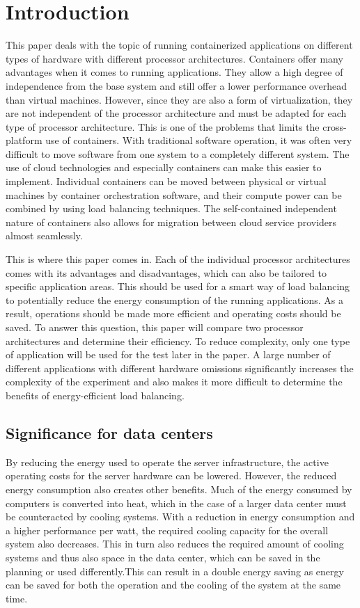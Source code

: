 \section{Introduction}
This paper deals with the topic of running containerized applications on
different types of hardware with different processor architectures.  Containers
offer many advantages when it comes to running applications. They allow a high
degree of independence from the base system and still offer a lower performance
overhead than virtual machines. However, since they are also a form of
virtualization, they are not independent of the processor architecture and must
be adapted for each type of processor architecture. This is one of the problems
that limits the cross-platform use of containers.  With traditional software
operation, it was often very difficult to move software from one system to a
completely different system. The use of cloud technologies and especially
containers can make this easier to implement. Individual containers can be
moved between physical or virtual machines by container orchestration software,
and their compute power can be combined by using load balancing techniques.
The self-contained independent nature of containers also allows for migration
between cloud service providers almost seamlessly.

This is where this paper comes in. Each of the individual processor
architectures comes with its advantages and disadvantages, which can also be
tailored to specific application areas. This should be used for a smart way of
load balancing to potentially reduce the energy consumption of the running
applications. As a result, operations should be made more efficient and
operating costs should be saved.  To answer this question, this paper will
compare two processor architectures and determine their efficiency. To reduce
complexity, only one type of application will be used for the test later in the
paper. A large number of different applications with different hardware
omissions significantly increases the complexity of the experiment and also
makes it more difficult to determine the benefits of energy-efficient load
balancing.

\subsection{Significance for data centers}
By reducing the energy used to operate the server infrastructure, the active
operating costs for the server hardware can be lowered. However, the reduced
energy consumption also creates other benefits. Much of the energy consumed by
computers is converted into heat, which in the case of a larger data center
must be counteracted by cooling systems. With a reduction in energy consumption
and a higher performance per watt, the required cooling capacity for the
overall system also decreases. This in turn also reduces the required amount of
cooling systems and thus also space in the data center, which can be saved in
the planning or used differently.This can result in a double energy saving as
energy can be saved for both the operation and the cooling of the system at the
same time.

